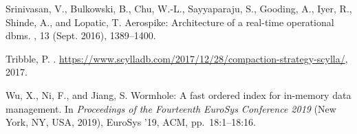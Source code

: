\documentclass[sigplan,10pt]{acmart}
\begin{document}
\begin{thebibliography}{10}
{\sc Srinivasan, V., Bulkowski, B., Chu, W.-L., Sayyaparaju, S., Gooding, A.,
  Iyer, R., Shinde, A., and Lopatic, T.}
\newblock Aerospike: Architecture of a real-time operational dbms.
, 13 (Sept. 2016), 1389--1400.

{\sc Tribble, P.}
.
\newblock
  \url{https://www.scylladb.com/2017/12/28/compaction-strategy-scylla/}, 2017.

{\sc Wu, X., Ni, F., and Jiang, S.}
\newblock Wormhole: A fast ordered index for in-memory data management.
\newblock In {\em Proceedings of the Fourteenth EuroSys Conference 2019\/} (New
  York, NY, USA, 2019), EuroSys '19, ACM, pp.~18:1--18:16.

\end{thebibliography}


\end{document}
